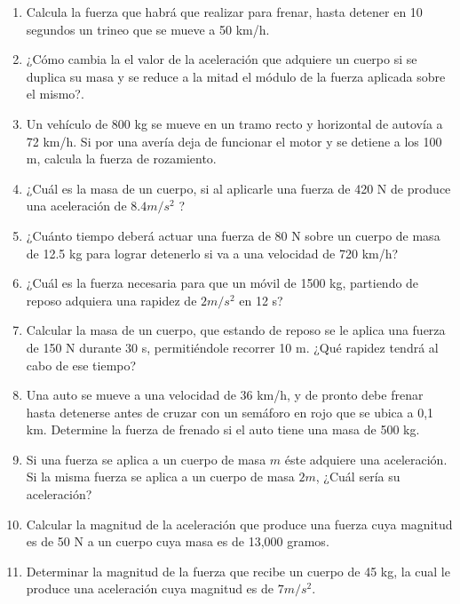 \begin{enumerate}
\item Calcula la fuerza que habrá que realizar para frenar, hasta detener en 10 segundos un trineo que se mueve a 50 km/h.

\item ¿Cómo cambia la el valor de la aceleración que adquiere un cuerpo si se duplica su masa y se reduce a la mitad el módulo de 
la fuerza aplicada sobre el mismo?.

\item Un vehículo de 800 kg se mueve en un tramo recto y horizontal de autovía a 72 km/h. Si por una avería deja de funcionar 
el motor y se detiene a los 100 m, calcula la fuerza de rozamiento.

\item ¿Cuál es la masa de un cuerpo, si al aplicarle una fuerza de 420 N de produce una aceleración de $8.4 m/s^2$ ?

\item ¿Cuánto tiempo deberá actuar una fuerza de 80 N sobre un cuerpo de masa de 12.5 kg para lograr detenerlo si va a una 
velocidad de 720 km/h?

\item ¿Cuál es la fuerza necesaria para que un móvil de 1500 kg, partiendo de reposo adquiera una rapidez de $2 m/s^2$ en 12 s?

\item Calcular la masa de un cuerpo, que estando de reposo se le aplica una fuerza de 150 N durante 30 s, permitiéndole recorrer 
10 m. ¿Qué rapidez tendrá al cabo de ese tiempo?

\item  Una auto se mueve a una 
velocidad de 36 km/h, y de pronto debe frenar hasta detenerse antes de cruzar con un semáforo en 
rojo que se ubica a 0,1 km. Determine la fuerza de frenado si el auto tiene una masa de 500 kg.

\item  Si una fuerza se aplica a un 
cuerpo de masa $m$ éste adquiere una aceleración. Si la misma fuerza se aplica a un cuerpo 
de 
masa $2m$, ¿Cuál sería su aceleración?

\item Calcular la magnitud de la aceleración que produce una fuerza cuya magnitud es de 50 N a un cuerpo cuya masa es de 13,000 
gramos.

\item Determinar la magnitud de la fuerza que recibe un cuerpo de 45 kg, la cual le produce una aceleración cuya magnitud es de 
$7 
m/s^2$.


\end{enumerate}

